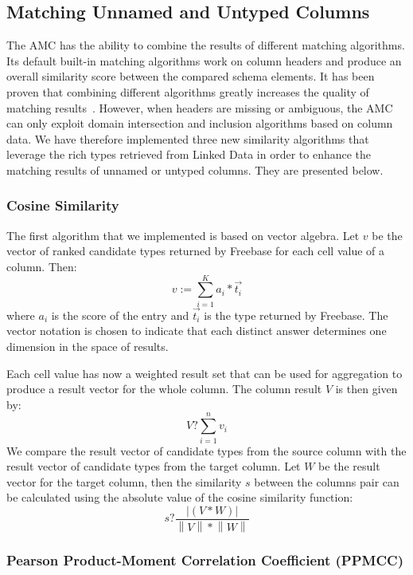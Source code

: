 \documentclass{../../Util/LaTEX/sig-alternate}
\begin{document}
\subsection{Matching Unnamed and Untyped Columns}
The AMC has the ability to combine the results of different matching algorithms. Its default built-in matching algorithms work on column headers and produce an overall similarity score between the compared schema elements. It has been proven that combining different algorithms greatly increases the quality of matching results~\cite{conf/icde/PeukertER12}\cite{conf/wise/StracciaT05}. However, when headers are missing or ambiguous, the AMC can only exploit domain intersection and inclusion algorithms based on column data. We have therefore implemented three new similarity algorithms that leverage the rich types retrieved from Linked Data in order to enhance the matching results of unnamed or untyped columns. They are presented below.


\subsubsection{Cosine Similarity}
The first algorithm that we implemented is based on vector algebra. Let $v$ be the vector of ranked candidate types returned by Freebase for each cell value of a column. Then:
\[v:=\sum^K_{i=1}{a_i}*\overrightarrow{t_i}\]
where $a_i$ is the score of the entry and $\overrightarrow{t_i}$ is the type returned by Freebase. The vector notation is chosen to indicate that each distinct answer determines one dimension in the space of results.

Each cell value has now a weighted result set that can be used for aggregation to produce a result vector for the whole column. The column result $V$ is then given by:
\[V?\sum^n_{i=1}{v_i}\]
We compare the result vector of candidate types from the source column with the result vector of candidate types from the target column. Let $W$ be the result vector for the target column, then the similarity $s$ between the columns pair can be calculated using the absolute value of the cosine similarity function:
\[s?\frac{\left|(V*W)\right|}{\left\|V\right\|*\left\|W\right\|}\]


\subsubsection{Pearson Product-Moment Correlation Coefficient (PPMCC)}
\end{document}
